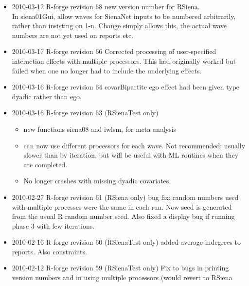\documentclass[a4paper,fleqn]{article}
\newcommand{\+}{\, + \,}
\newcommand{\sfn}[1]{\textsf{#1}}
\newcommand{\R}{{\sf R }}
\begin{document}
{\begin{itemize}
\begin{itemize}
\item New features and bug fixes as for revision 63 in RSienaTest.
\item 4-cycles effect has new shortName: cycle4.
\item some percentages on reports were proportions not percentages
\item Sped up treatment of missing values in sparse format networks.
\item Fix: now allows more than one value to indicate missing in covariates.
\end{itemize}
\item 2010-03-12 R-forge revision 68 new version number for RSiena.\\
In \sfn{siena01Gui}, allow waves for SienaNet inputs to be numbered
arbitrarily, rather than insisting on 1-n. Change simply allows this, the actual
wave numbers are not yet used on reports etc.
\item 2010-03-17 R-forge revision 66
Corrected processing of user-specified interaction effects with multiple
processors. This had originally worked but failed when one no longer had to
include the underlying effects.
\item 2010-03-16 R-forge revision 64
covarBipartite ego effect had been given type dyadic rather than ego.
\item 2010-03-16 R-forge revision 63 (RSienaTest only)
\begin{itemize}
\item new functions \sfn{siena08} and \sfn{iwlsm}, for meta analysis
\item can now use different processors for each wave. Not recommended: usually
  slower than by iteration, but will be useful with ML routines when they are
  completed.
\item No longer crashes with missing dyadic covariates.
\end{itemize}
\item 2010-02-27 R-forge revision 61 (RSiena only) bug fix: random numbers used
  with multiple processes were the same in each run. Now seed is generated
  from the usual \R random number seed. Also fixed a display bug if running
  phase 3 with few iterations.
\item 2010-02-16 R-forge revision 60 (RSienaTest only) added average indegrees
  to reports. Also constraints.
\item 2010-02-12 R-forge revision 59 (RSienaTest only) Fix to bugs in printing
  version numbers and in using multiple processors (would revert to RSiena

\end{itemize}}
\end{document}

